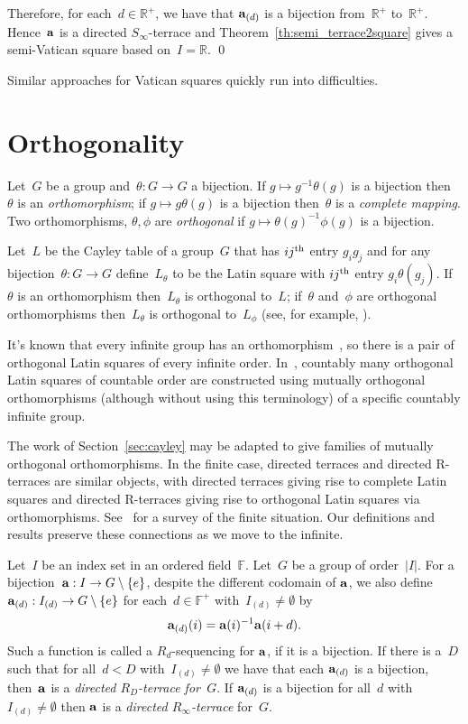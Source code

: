 \documentclass[12pt,a4paper]{article}
\newcommand{\R}{\mathbb{R}}
\newcommand{\F}{\mathbb{F}}
\renewcommand{\a}{\textup{\textbf{a}}}
\begin{document}
Therefore, for each~$d \in \R^+$, we have that ${\bf a}_{(d)}$ is a bijection from~$\R^+$ to~$\R^+$.  Hence~${\bf a}$ is a directed $S_{\infty}$-terrace and Theorem~\ref{th:semi_terrace2square} gives a semi-Vatican square based on~$I = \R$.
\qed

Similar approaches for Vatican squares quickly run into difficulties.



\section{Orthogonality}\label{sec:orth}

Let~$G$ be a group and~$\theta: G \rightarrow G$ a bijection.  If $g \mapsto g^{-1}\theta(g)$ is a bijection then~$\theta$ is an {\em orthomorphism}; if  $g \mapsto g\theta(g)$ is a bijection then~$\theta$ is a {\em complete mapping}.  Two orthomorphisms, $\theta, \phi$ are {\em orthogonal} if $g \mapsto \theta(g)^{-1} \phi(g)$ is a bijection.

Let~$L$ be the Cayley table of a group~$G$ that has $ij^{\rm th}$ entry $g_i g_j$ and for any bijection~$\theta: G \rightarrow G$ define~$L_\theta$ to be the Latin square with $ij^{\rm th}$ entry $g_i \theta(g_j)$.  If~$\theta$ is an orthomorphism then~$L_\theta$ is orthogonal to~$L$; if~$\theta$ and~$\phi$ are orthogonal orthomorphisms then~$L_\theta$ is orthogonal to~$L_\phi$ (see, for example, \cite{Evans07}).

It's known that every infinite group has an orthomorphism~\cite{Bateman50}, so there is a pair of orthogonal Latin squares of every infinite order.  In~\cite{BM91}, countably many orthogonal Latin squares of countable order are constructed using mutually orthogonal orthomorphisms (although without using this terminology) of a specific countably infinite group.

The work of Section~\ref{sec:cayley} may be adapted to give families of mutually orthogonal orthomorphisms.  In the finite case, directed terraces and directed R-terraces are similar objects, with directed terraces giving rise to complete Latin squares and directed R-terraces giving rise to orthogonal Latin squares via orthomorphisms.  See~\cite{Evans07} for a survey of the finite situation.  Our definitions and results preserve these connections as we move to the infinite.

Let~$I$ be an index set in an ordered field~$\F$.  Let~$G$ be a group of order~$|I|$.  For a bijection~${\bf a}: I \rightarrow G \setminus \{ e \}$, despite the different codomain of ${\bf a}$, we also define~${\bf a}_{(d)}: I_{(d)} \rightarrow G \setminus \{ e \}$ for each~$d \in \F^+$ with~$I_{(d)} \neq \emptyset$ by
$${\bf a}_{(d)}(i) = {\bf a}(i)^{-1}{\bf a}(i+d).$$ Such a function is called a $R_d$-sequencing for $\a$, if it is a bijection.
If there is a~$D$ such that for all~$d < D$ with~$I_{(d)} \neq \emptyset$ we have that each ${\bf a}_{(d)}$ is a bijection, then~${\bf a}$ is a {\em directed $R_D$-terrace for~$G$}.  If ${\bf a}_{(d)}$ is a bijection for all~$d$  with~$I_{(d)} \neq \emptyset$ then ${\bf a}$ is  a {\em directed $R_{\infty}$-terrace} for~$G$.
\end{document}
